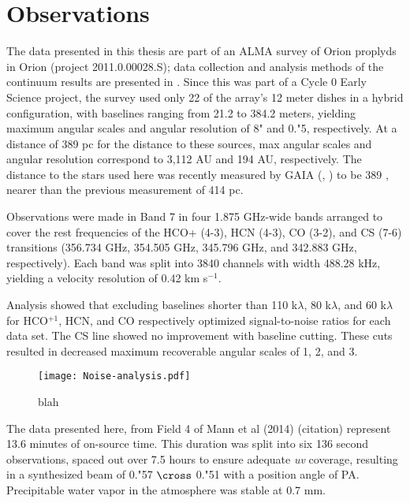 \chapter{Observations}
\label{chap:observations}

The data presented in this thesis are part of an ALMA survey of Orion proplyds in Orion (project 2011.0.00028.S); data collection and analysis methods of the continuum results are presented in \citep{mann_alma_2014}. Since this was part of a Cycle 0 Early Science project, the survey used only 22 of the array's 12 meter dishes in a hybrid configuration, with baselines ranging from 21.2 to 384.2 meters, yielding maximum angular scales and angular resolution of 8" and 0."5, respectively. At a distance of 389 pc for the distance to these sources, max angular scales and angular resolution correspond to 3,112 AU and 194 AU, respectively. The distance to the stars used here was recently measured by GAIA (\citep{gaia_collaboration_gaia_2016}, \citep{gaia_collaboration_gaia_2018}) to be 389 , nearer than the previous measurement of 414 pc.

Observations were made in Band 7 in four 1.875 GHz-wide bands arranged to cover the rest frequencies of the HCO+ (4-3), HCN (4-3), CO (3-2), and CS (7-6) transitions (356.734 GHz, 354.505 GHz, 345.796 GHz, and 342.883 GHz, respectively). Each band was split into 3840 channels with width 488.28 kHz, yielding a velocity resolution of 0.42 km s$^{-1}$.



Analysis showed that excluding baselines shorter than 110 k$\lambda$, 80 k$\lambda$, and 60 k$\lambda$ for HCO$^{+1}$, HCN, and CO respectively optimized signal-to-noise ratios for each data set. The CS line showed no improvement with baseline cutting. These cuts resulted in decreased maximum recoverable angular scales of 1, 2, and 3.

\begin{figure}
  \centering
  \texttt{[image: Noise-analysis.pdf]}
  \caption{blah}
\end{figure}

The data presented here, from Field 4 of Mann et al (2014) (citation) represent 13.6 minutes of on-source time. This duration was split into six 136 second observations, spaced out over 7.5 hours to ensure adequate \textit{uv} coverage, resulting in a synthesized beam of 0."57 $\cross$ 0."51 with a position angle of PA. Precipitable water vapor in the atmosphere was stable at 0.7 mm.




